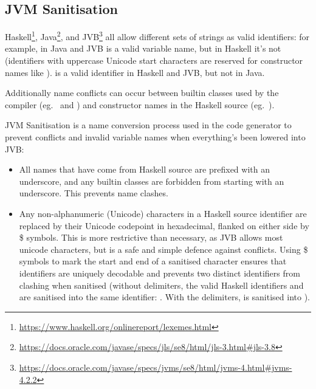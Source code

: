 \documentclass[dissertation.tex]{subfiles}
\begin{document}
{{{            
        }
    }
    \subsection{JVM Sanitisation}\label{sec:jvm-sanitisation}
    {

        Haskell\footnote{\url{https://www.haskell.org/onlinereport/lexemes.html}},
        Java\footnote{\url{https://docs.oracle.com/javase/specs/jls/se8/html/jls-3.html\#jls-3.8}}, and
        JVB\footnote{\url{https://docs.oracle.com/javase/specs/jvms/se8/html/jvms-4.html\#jvms-4.2.2}} all allow
        different sets of strings as valid identifiers: for example, in Java and JVB  is a valid variable
        name, but in Haskell it's not (identifiers with uppercase Unicode start characters are reserved for
        constructor names like ). \monospace{(+)} is a valid identifier in Haskell and JVB, but not in
        Java.

        Additionally name conflicts can occur between builtin classes used by the compiler (eg.\  and
        ) and constructor names in the Haskell source (eg.\ ).

        JVM Sanitisation is a name conversion process used in the code generator to prevent conflicts and invalid
        variable names when everything's been lowered into JVB:

        \begin{itemize}
        \item
        {

            All names that have come from Haskell source are prefixed with an underscore, and any builtin classes
            are forbidden from starting with an underscore. This prevents name clashes.

        }
        \item
        {

            Any non-alphanumeric (Unicode) characters in a Haskell source identifier are replaced by their Unicode
            codepoint in hexadecimal, flanked on either side by \$ symbols. This is more restrictive than necessary,
            as JVB allows most unicode characters, but is a safe and simple defence against conflicts. Using \$
            symbols to mark the start and end of a sanitised character ensures that identifiers are uniquely
            decodable and prevents two distinct identifiers from clashing when sanitised (without delimiters, the
            valid Haskell identifiers \haskell{#\(\pi\)#} and  are sanitised into the same identifier:
            . With the delimiters, \haskell{#\(\pi\)#} is sanitised into ).

}
\end{itemize}}}
\end{document}
